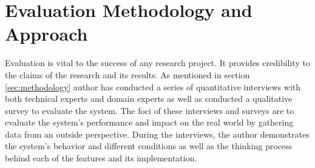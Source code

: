 \section{Evaluation Methodology and Approach} \label{sec:evaluation-methodology}

Evaluation is vital to the success of any research project. It provides credibility to the claims of the research and its results. As mentioned in section \ref{sec:methodology} author has conducted a series of quantitative interviews with both technical experts and domain experts as well as conducted a qualitative survey to evaluate the system. The foci of these interviews and surveys are to evaluate the system's performance and impact on the real world by gathering data from an outside perspective. During the interviews, the author demonstrates the system's behavior and different conditions as well as the thinking process behind each of the features and its implementation.